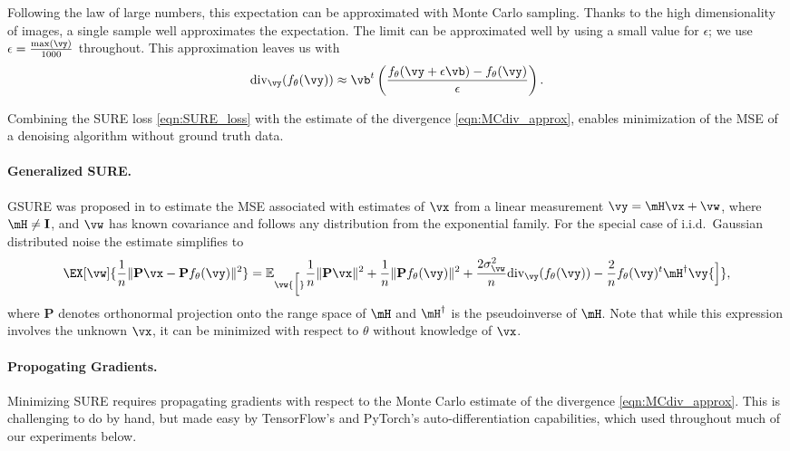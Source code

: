 \documentclass{article}
\newcommand\img{\vx}
\newcommand\obs{\vy}
\newcommand\noise{\vw}
\begin{document}
Following the law of large numbers, this expectation can be approximated with Monte Carlo sampling. Thanks to the high dimensionality of images, a single sample well approximates the expectation. The limit can be approximated well by using a small value for $\epsilon$; we use $\epsilon=\frac{\max(\vy)}{1000}$ throughout. This approximation leaves us with
\begin{align}\label{eqn:MCdiv_approx}
    \text{div}_\vy(f_\theta (\vy))\approx  \vb^t \left( \frac{f_\theta(\vy+\epsilon \vb)-f_\theta(\vy)}{\epsilon} \right).
\end{align}

Combining the SURE loss \eqref{eqn:SURE_loss} with the estimate of the divergence \eqref{eqn:MCdiv_approx}, enables minimization of the MSE of a denoising algorithm without ground truth data. 

\paragraph{Generalized SURE.} GSURE was proposed in \cite{GSURE} to estimate the MSE associated with estimates of $\img$ from a linear measurement $\obs = \mH \img + \noise$, where $\mH\neq \mathbf{I}$, and $\noise$ has known covariance and follows any distribution from the exponential family. %
For the special case of i.i.d.~Gaussian distributed noise the estimate simplifies to
\begin{align}\label{eqn:GSURE}
    \EX[\vw]{ \frac{1}{n}\|\mathbf{P}\img-\mathbf{P}f_\theta(\vy)\|^2}
    =\mathbb{E}_\vw {\Big[} \frac{1}{n}\|\mathbf{P}\vx\|^2+\frac{1}{n}\|\mathbf{P}f_\theta(\vy)\|^2+\frac{2\sigma_\vw^2}{n}\text{div}_\vy(f_\theta (\vy))
    -\frac{2}{n}f_\theta (\vy)^t\mH^\dagger \vy {\Big]},
\end{align}
where $\mathbf{P}$ denotes orthonormal projection onto the range space of $\mH$ and $\mH^\dagger$ is the pseudoinverse of $\mH$. Note that while this expression involves the unknown $\img$, it can be minimized with respect to $\theta$ without knowledge of $\img$.

\paragraph{Propogating Gradients.}
Minimizing SURE requires propagating gradients with respect to the Monte Carlo estimate of the divergence \eqref{eqn:MCdiv_approx}. This is challenging to do by hand, but made easy by TensorFlow's and PyTorch's auto-differentiation capabilities, which used throughout much of our experiments below.
%
\end{document}
